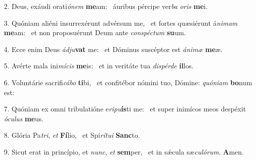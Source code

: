 2. Deus, exáudi orati\textit{ó}\textit{nem} \textbf{me}am: \ast\  áuribus pércipe ver\textit{ba} \textit{o}\textit{ris} \textbf{me}i.\

3. Quóniam aliéni insurrexérunt advérsum me, \dag\  et fortes quæsiérunt á\textit{ni}\textit{mam} \textbf{me}am: \ast\  et non proposuérunt Deum ante \textit{con}\textit{spéc}\textit{tum} \textbf{su}um.\

4. Ecce enim Deus \textit{ád}\textit{ju}\textbf{vat} me: \ast\  et Dóminus suscéptor est \textit{á}\textit{ni}\textit{mæ} \textbf{me}æ.\

5. Avérte mala ini\textit{mí}\textit{cis} \textbf{me}is: \ast\  et in veritáte tua \textit{dis}\textit{pér}\textit{de} \textbf{il}los.\

6. Voluntárie sacrifi\textit{cá}\textit{bo} \textbf{ti}bi, \ast\  et confitébor nómini tuo, Dómine: \textit{quón}\textit{i}\textit{am} \textbf{bo}num est:\

7. Quóniam ex omni tribulatióne e\textit{ri}\textit{pu}\textbf{ís}ti me: \ast\  et super inimícos meos despéxit \textit{ó}\textit{cu}\textit{lus} \textbf{me}us.\

8. Glória Pa\textit{tri}, \textit{et} \textbf{Fí}lio, \ast\  et Spi\textit{rí}\textit{tu}\textit{i} \textbf{Sanc}to.\

9. Sicut erat in princípio, et \textit{nunc}, \textit{et} \textbf{sem}per, \ast\  et in sǽcula sæ\textit{cu}\textit{ló}\textit{rum}. \textbf{A}men.\

